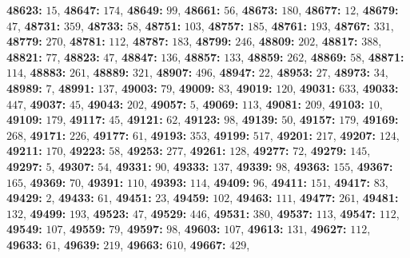 \textsf{\bfseries 48623:} $15$, \textsf{\bfseries 48647:} $174$, \textsf{\bfseries 48649:} $99$, \textsf{\bfseries 48661:} $56$, \textsf{\bfseries 48673:} $180$, \textsf{\bfseries 48677:} $12$, \textsf{\bfseries 48679:} $47$, \textsf{\bfseries 48731:} $359$, \textsf{\bfseries 48733:} $58$, \textsf{\bfseries 48751:} $103$, \textsf{\bfseries 48757:} $185$, \textsf{\bfseries 48761:} $193$, \textsf{\bfseries 48767:} $331$, \textsf{\bfseries 48779:} $270$, \textsf{\bfseries 48781:} $112$, \textsf{\bfseries 48787:} $183$, \textsf{\bfseries 48799:} $246$, \textsf{\bfseries 48809:} $202$, \textsf{\bfseries 48817:} $388$, \textsf{\bfseries 48821:} $77$, \textsf{\bfseries 48823:} $47$, \textsf{\bfseries 48847:} $136$, \textsf{\bfseries 48857:} $133$, \textsf{\bfseries 48859:} $262$, \textsf{\bfseries 48869:} $58$, \textsf{\bfseries 48871:} $114$, \textsf{\bfseries 48883:} $261$, \textsf{\bfseries 48889:} $321$, \textsf{\bfseries 48907:} $496$, \textsf{\bfseries 48947:} $22$, \textsf{\bfseries 48953:} $27$, \textsf{\bfseries 48973:} $34$, \textsf{\bfseries 48989:} $7$, \textsf{\bfseries 48991:} $137$, \textsf{\bfseries 49003:} $79$, \textsf{\bfseries 49009:} $83$, \textsf{\bfseries 49019:} $120$, \textsf{\bfseries 49031:} $633$, \textsf{\bfseries 49033:} $447$, \textsf{\bfseries 49037:} $45$, \textsf{\bfseries 49043:} $202$, \textsf{\bfseries 49057:} $5$, \textsf{\bfseries 49069:} $113$, \textsf{\bfseries 49081:} $209$, \textsf{\bfseries 49103:} $10$, \textsf{\bfseries 49109:} $179$, \textsf{\bfseries 49117:} $45$, \textsf{\bfseries 49121:} $62$, \textsf{\bfseries 49123:} $98$, \textsf{\bfseries 49139:} $50$, \textsf{\bfseries 49157:} $179$, \textsf{\bfseries 49169:} $268$, \textsf{\bfseries 49171:} $226$, \textsf{\bfseries 49177:} $61$, \textsf{\bfseries 49193:} $353$, \textsf{\bfseries 49199:} $517$, \textsf{\bfseries 49201:} $217$, \textsf{\bfseries 49207:} $124$, \textsf{\bfseries 49211:} $170$, \textsf{\bfseries 49223:} $58$, \textsf{\bfseries 49253:} $277$, \textsf{\bfseries 49261:} $128$, \textsf{\bfseries 49277:} $72$, \textsf{\bfseries 49279:} $145$, \textsf{\bfseries 49297:} $5$, \textsf{\bfseries 49307:} $54$, \textsf{\bfseries 49331:} $90$, \textsf{\bfseries 49333:} $137$, \textsf{\bfseries 49339:} $98$, \textsf{\bfseries 49363:} $155$, \textsf{\bfseries 49367:} $165$, \textsf{\bfseries 49369:} $70$, \textsf{\bfseries 49391:} $110$, \textsf{\bfseries 49393:} $114$, \textsf{\bfseries 49409:} $96$, \textsf{\bfseries 49411:} $151$, \textsf{\bfseries 49417:} $83$, \textsf{\bfseries 49429:} $2$, \textsf{\bfseries 49433:} $61$, \textsf{\bfseries 49451:} $23$, \textsf{\bfseries 49459:} $102$, \textsf{\bfseries 49463:} $111$, \textsf{\bfseries 49477:} $261$, \textsf{\bfseries 49481:} $132$, \textsf{\bfseries 49499:} $193$, \textsf{\bfseries 49523:} $47$, \textsf{\bfseries 49529:} $446$, \textsf{\bfseries 49531:} $380$, \textsf{\bfseries 49537:} $113$, \textsf{\bfseries 49547:} $112$, \textsf{\bfseries 49549:} $107$, \textsf{\bfseries 49559:} $79$, \textsf{\bfseries 49597:} $98$, \textsf{\bfseries 49603:} $107$, \textsf{\bfseries 49613:} $131$, \textsf{\bfseries 49627:} $112$, \textsf{\bfseries 49633:} $61$, \textsf{\bfseries 49639:} $219$, \textsf{\bfseries 49663:} $610$, \textsf{\bfseries 49667:} $429$, 
